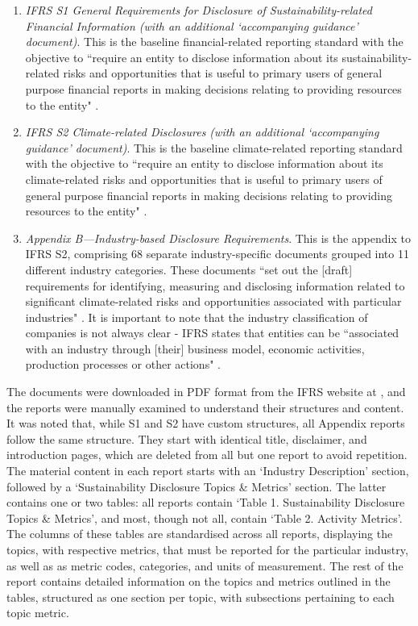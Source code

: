 \begin{enumerate}
    \item \textit{IFRS S1 General Requirements for Disclosure of Sustainability-related Financial Information (with an additional `accompanying guidance' document)}. This is the baseline financial-related reporting standard with the objective to ``require an entity to disclose information about its sustainability-related risks and opportunities that is useful to primary users of general purpose financial reports in making decisions relating to providing resources to the entity" \cite{ifrs_s1}. 
    \item \textit{IFRS S2 Climate-related Disclosures (with an additional `accompanying guidance' document)}. This is the baseline climate-related reporting standard with the objective to ``require an entity to disclose information about its climate-related risks and opportunities that is useful to primary users of general purpose financial reports in making decisions relating to providing resources to the entity" \cite{ifrs_s2}.
    \item \textit{Appendix B—Industry-based Disclosure Requirements}. This is the appendix to IFRS S2, comprising 68 separate industry-specific documents grouped into 11 different industry categories. These documents ``set out the [draft] requirements for identifying, measuring and disclosing information related to significant climate-related risks and opportunities associated with particular industries" \cite{ifrs_appendix}. It is important to note that the industry classification of companies is not always clear - IFRS states that entities can be ``associated with an industry through [their] business model, economic activities, production processes or other actions" \cite{ifrs_appendix}.
\end{enumerate}

The documents were downloaded in PDF format from the IFRS website at \cite{ifrs_s1,ifrs_s2,ifrs_appendix}, and the reports were manually examined to understand their structures and content. It was noted that, while S1 and S2 have custom structures, all Appendix reports follow the same structure. They start with identical title, disclaimer, and introduction pages, which are deleted from all but one report to avoid repetition. The material content in each report starts with an `Industry Description' section, followed by a `Sustainability Disclosure Topics \& Metrics' section. The latter contains one or two tables: all reports contain `Table 1. Sustainability Disclosure Topics \& Metrics', and most, though not all, contain `Table 2. Activity Metrics'. The columns of these tables are standardised across all reports, displaying the topics, with respective metrics, that must be reported for the particular industry, as well as as metric codes, categories, and units of measurement. The rest of the report contains detailed information on the topics and metrics outlined in the tables, structured as one section per topic, with subsections pertaining to each topic metric. \\

